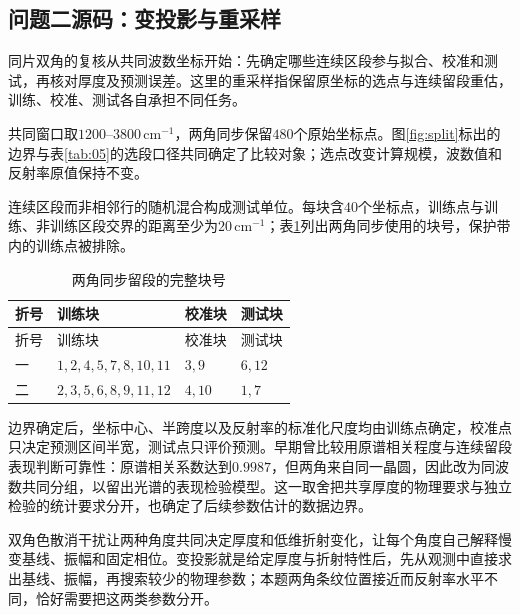 \subsection{问题二源码：变投影与重采样}
\label{sec:q2-source}

同片双角的复核从共同波数坐标开始：先确定哪些连续区段参与拟合、校准和测试，再核对厚度及预测误差。这里的重采样指保留原坐标的选点与连续留段重估，训练、校准、测试各自承担不同任务。

共同窗口取$1200$--$3800\,\mathrm{cm}^{-1}$，两角同步保留$480$个原始坐标点。图\ref{fig:split}标出的边界与表\ref{tab:05}的选段口径共同确定了比较对象；选点改变计算规模，波数值和反射率原值保持不变。

连续区段而非相邻行的随机混合构成测试单位。每块含$40$个坐标点，训练点与训练、非训练区段交界的距离至少为$20\,\mathrm{cm}^{-1}$；表\ref{tab:q2-app-split}列出两角同步使用的块号，保护带内的训练点被排除。

\begingroup
\small
\renewcommand{\arraystretch}{1.15}
\begin{longtable}{>{\centering\arraybackslash}p{}>{\centering\arraybackslash}p{}>{\centering\arraybackslash}p{}>{\centering\arraybackslash}p{}}
\caption{两角同步留段的完整块号}\label{tab:q2-app-split}\\
\toprule
折号 & 训练块 & 校准块 & 测试块 \\
\midrule
\endfirsthead
\toprule
折号 & 训练块 & 校准块 & 测试块 \\
\midrule
\endhead
\bottomrule
\endfoot
一 & $1,2,4,5,7,8,10,11$ & $3,9$ & $6,12$ \\
二 & $2,3,5,6,8,9,11,12$ & $4,10$ & $1,7$ \\
\end{longtable}
\endgroup

边界确定后，坐标中心、半跨度以及反射率的标准化尺度均由训练点确定，校准点只决定预测区间半宽，测试点只评价预测。早期曾比较用原谱相关程度与连续留段表现判断可靠性：原谱相关系数达到$0.9987$，但两角来自同一晶圆，因此改为同波数共同分组，以留出光谱的表现检验模型。这一取舍把共享厚度的物理要求与独立检验的统计要求分开，也确定了后续参数估计的数据边界。

双角色散消干扰让两种角度共同决定厚度和低维折射变化，让每个角度自己解释慢变基线、振幅和固定相位。变投影就是给定厚度与折射特性后，先从观测中直接求出基线、振幅，再搜索较少的物理参数；本题两角条纹位置接近而反射率水平不同，恰好需要把这两类参数分开。

